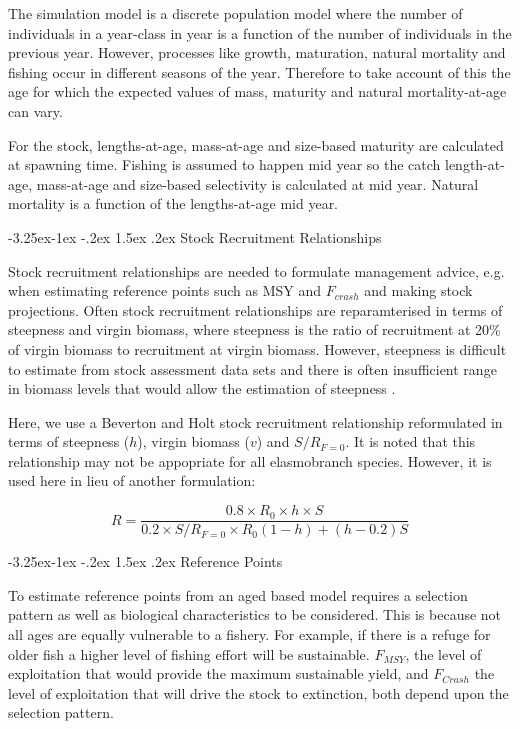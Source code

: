\documentclass[a4paper, 10pt]{article}
\makeatletter
\renewcommand{\subsection}{\@startsection{subsection}{2}{\z@}%
 {-3.25ex\@plus -1ex \@minus -.2ex}%
 {1.5ex \@plus .2ex}%
 {\normalfont\bfseries\slshape}}
\makeatother
\begin{document}
The simulation model is a discrete population model where the number of individuals
in a year-class in year is a function of the number of individuals in the previous year.
However, processes like growth, maturation, natural mortality and fishing occur in
different seasons of the year. Therefore to take account of this the age for which
the expected values of mass, maturity and natural mortality-at-age can vary. 

For the stock, lengths-at-age, mass-at-age and size-based maturity are calculated at spawning time.
Fishing is assumed to happen mid year so the catch length-at-age, mass-at-age and
size-based selectivity is calculated at mid year. Natural mortality is a function
of the lengths-at-age mid year.

\subsection{Stock Recruitment Relationships}

Stock recruitment relationships are needed to formulate management advice, e.g.
when estimating reference points such as MSY and $F_{crash}$ and making stock projections.
Often stock recruitment relationships are reparamterised in terms of steepness and
virgin biomass, where steepness is the ratio of recruitment at 20\% of virgin biomass
to recruitment at virgin biomass. However, steepness is difficult to estimate from
stock assessment data sets and there is often insufficient range in biomass levels
that would allow the estimation of steepness \citet{ISSF2011steep}.

Here, we use a Beverton and Holt stock recruitment relationship reformulated in
terms of steepness ($h$), virgin biomass ($v$) and $S/R_{F=0}$. It is noted that
this relationship may not be appopriate for all elasmobranch species. However, it
is used here in lieu of another formulation:

\begin{equation}
R=\frac{0.8 \times R_0 \times h \times S}{0.2 \times S/R_{F=0} \times R_0(1-h)+(h-0.2)S} \label{eqBHsteepness}
\end{equation} 


\subsection{Reference Points}

To estimate reference points from an aged based model requires a selection pattern
as well as biological characteristics to be considered.
This is because not all ages are equally vulnerable to a fishery. For example,
if there is a refuge for older fish a higher level of fishing effort will be sustainable.
$F_{MSY}$, the level of exploitation that would provide the maximum sustainable yield, and $F_{Crash}$
the level of exploitation that will drive the stock to extinction, both depend upon the selection pattern.
\end{document}
